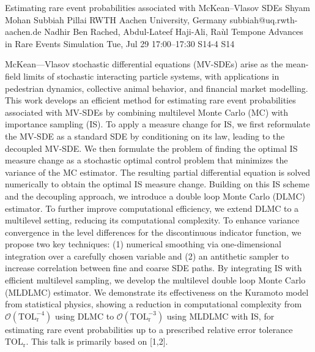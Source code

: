 \begin{talk}
  {Estimating rare event probabilities associated with McKean--Vlasov SDEs}%
  {Shyam Mohan Subbiah Pillai}%
  {RWTH Aachen University, Germany}%
  {subbiah@uq.rwth-aachen.de}%
  {Nadhir Ben Rached, Abdul-Lateef Haji-Ali, Raùl Tempone}%
  {Advances in Rare Events Simulation}%
  {Tue, Jul 29 17:00–17:30}%
  {S14-4}%
  {S14}%
				
			
McKean---Vlasov stochastic differential equations (MV-SDEs) arise as the mean-field limits of stochastic interacting particle systems, with applications in pedestrian dynamics, collective animal behavior, and financial market modelling. This work develops an efficient method for estimating rare event probabilities associated with MV-SDEs by combining multilevel Monte Carlo (MC) with importance sampling (IS). To apply a measure change for IS, we first reformulate the MV-SDE as a standard SDE by conditioning on its law, leading to the decoupled MV-SDE. We then formulate the problem of finding the optimal IS measure change as a stochastic optimal control problem that minimizes the variance of the MC estimator. The resulting partial differential equation is solved numerically to obtain the optimal IS measure change. Building on this IS scheme and the decoupling approach, we introduce a double loop Monte Carlo (DLMC) estimator. To further improve computational efficiency, we extend DLMC to a multilevel setting, reducing its computational complexity. To enhance variance convergence in the level differences for the discontinuous indicator function, we propose two key techniques: (1) numerical smoothing via one-dimensional integration over a carefully chosen variable and (2) an antithetic sampler to increase correlation between fine and coarse SDE paths. By integrating IS with efficient multilevel sampling, we develop the multilevel double loop Monte Carlo (MLDLMC) estimator. We demonstrate its effectiveness on the Kuramoto model from statistical physics, showing a reduction in computational complexity from $\mathcal{O}(\mathrm{TOL}_\mathrm{r}^{-4})$ using DLMC to $\mathcal{O}(\mathrm{TOL}_\mathrm{r}^{-3})$ using MLDLMC with IS, for estimating rare event probabilities up to a prescribed relative error tolerance $\mathrm{TOL}_\mathrm{r}$. This talk is primarily based on [1,2].

\medskip


\end{talk}
